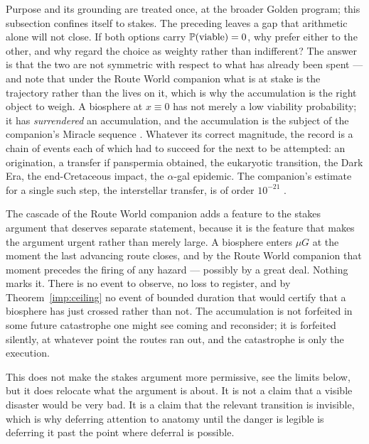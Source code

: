 \noindent Purpose and its grounding are treated once, at
the broader Golden program; this subsection confines itself to stakes. The preceding leaves a gap that arithmetic alone will not close. If both
options carry $\mathbb{P}(\text{viable})=0$, why prefer either to the other,
and why regard the choice as weighty rather than indifferent? The answer is that the two are not symmetric with respect to what has
already been spent --- and note that under
the Route World companion \cite{GoldenRouteWorld} what is at stake is the trajectory
rather than the lives on it, which is why the accumulation is the right
object to weigh. A biosphere at $x\equiv0$ has not merely a low
viability probability; it has \emph{surrendered} an accumulation, and
the accumulation is the subject of the companion's Miracle sequence
\cite{Nexus}. Whatever its correct magnitude, the record is a chain of
events each of which had to succeed for the next to be attempted: an
origination, a transfer if panspermia obtained, the eukaryotic
transition, the Dark Era, the end-Cretaceous impact, the
$\alpha$-gal epidemic. The companion's estimate for a single such
step, the interstellar transfer, is of order $10^{-21}$
\cite{Nexus}.



\begin{remark}\label{hr:rem:silentforfeit}
The cascade of the Route World companion \cite{GoldenRouteWorld} adds a feature to the stakes
argument that deserves separate statement, because it is the feature
that makes the argument urgent rather than merely large. A biosphere enters $\mu G$ at the moment the last advancing route
closes, and by the Route World companion \cite{GoldenRouteWorld} that moment precedes the
firing of any hazard --- possibly by a great deal. Nothing marks it.
There is no event to observe, no loss to register, and by
Theorem~\ref{imp:ceiling} no event of bounded duration that would
certify that a biosphere has just crossed rather than not. The
accumulation is not forfeited in some future catastrophe one might see
coming and reconsider; it is forfeited silently, at whatever point the
routes ran out, and the catastrophe is only the execution.

This does not make the stakes argument more permissive, see the
limits below, but it does relocate what the argument is about. It is
not a claim that a visible disaster would be very bad. It is a claim
that the relevant transition is invisible, which is why deferring
attention to anatomy until the danger is legible is deferring it past
the point where deferral is possible.
\end{remark}

